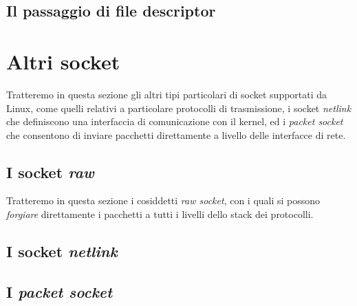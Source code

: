 \subsection{Il passaggio di file descriptor}
\label{sec:sock_fd_passing}





\section{Altri socket}
\label{sec:socket_other}

Tratteremo in questa sezione gli altri tipi particolari di socket supportati
da Linux, come quelli relativi a particolare protocolli di trasmissione, i
socket \textit{netlink} che definiscono una interfaccia di comunicazione con
il kernel, ed i \textit{packet socket} che consentono di inviare pacchetti
direttamente a livello delle interfacce di rete. 

\subsection{I socket \textit{raw}}
\label{sec:socket_raw}

Tratteremo in questa sezione i cosiddetti \textit{raw socket}, con i quali si
possono \textsl{forgiare} direttamente i pacchetti a tutti i livelli dello
stack dei protocolli. 

\subsection{I socket \textit{netlink}}
\label{sec:socket_netlink}


\subsection{I \textit{packet socket}}
\label{sec:packet_socket}


% 





